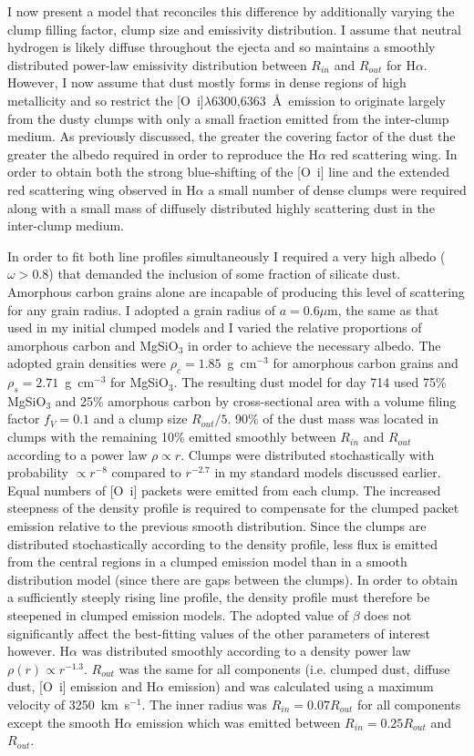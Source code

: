I now present a model that reconciles this difference by additionally varying the clump filling factor, clump size and emissivity distribution.  I assume that neutral hydrogen is likely diffuse throughout the ejecta and so maintains a smoothly distributed power-law emissivity distribution between $R_{in}$ and $R_{out}$ for H$\alpha$.  However, I now assume that dust mostly forms in dense regions of high metallicity and so restrict the [O~{\sc i}]$\lambda$6300,6363~\AA\ emission to originate largely from the dusty clumps with only a small fraction emitted from the inter-clump medium.  As previously discussed, the greater the covering factor of the dust the greater the albedo required in order to reproduce the H$\alpha$ red scattering wing. In order to obtain both the strong blue-shifting of the [O~{\sc i}] line and the extended red scattering wing observed in H$\alpha$ a small number of dense clumps were required along with a small mass of diffusely distributed highly scattering dust in the inter-clump medium.


In order to fit both line profiles simultaneously I required a very high albedo ($\omega > 0.8$) that demanded the inclusion of some fraction of silicate dust. Amorphous carbon grains alone are incapable of producing this level of scattering for any grain radius.  I adopted a grain radius of $a=0.6\mu$m, the same as that used in my initial clumped models and I varied the relative proportions of amorphous carbon and MgSiO$_3$ in order to achieve the necessary albedo.  The adopted grain densities were $\rho_c=1.85$~g~cm$^{-3}$ for amorphous carbon grains and $\rho_s = 2.71$~g~cm$^{-3}$ for MgSiO$_3$.  The resulting dust model for day 714 used 75\% MgSiO$_3$ and 25\% amorphous carbon by cross-sectional area with a volume filing factor $f_V=0.1$ and a clump size $R_{out}/5$.  90\% of the dust mass was located in clumps with the remaining 10\% emitted smoothly between $R_{in}$ and $R_{out}$ according to a power law $\rho \propto r$. Clumps were distributed stochastically with probability $\propto r^{-8}$ compared to $r^{-2.7}$ in my standard models discussed earlier. Equal numbers of [O~{\sc i}] packets were emitted from each clump. The increased steepness of the density profile is required to compensate for the clumped packet emission relative to the previous smooth distribution.  Since the clumps are distributed stochastically according to the density profile, less flux is emitted from the central regions in a clumped emission model than in a smooth distribution model (since there are gaps between the clumps).  In order to obtain a sufficiently steeply rising line profile, the density profile must therefore be steepened in clumped emission models. The adopted value of $\beta$ does not significantly affect the best-fitting values of the other parameters of interest however.  H$\alpha$ was distributed smoothly according to a density power law $\rho(r) \propto r^{-1.3}$.  $R_{out}$ was the same for all components (i.e. clumped dust, diffuse dust, [O~{\sc i}] emission and H$\alpha$ emission) and was calculated using a maximum velocity of 3250~km~s$^{-1}$.  The inner radius was $R_{in} = 0.07 R_{out}$ for all components except the smooth H$\alpha$ emission which was emitted between $R_{in}=0.25R_{out}$ and $R_{out}$.  

